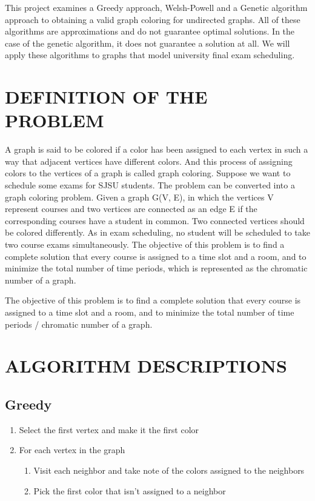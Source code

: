 \documentclass[12]{article}
\begin{document}
This project examines a Greedy approach, Welsh-Powell and a Genetic algorithm approach to obtaining a valid graph coloring for undirected graphs. All of these algorithms are approximations and do not guarantee optimal solutions. In the case of the genetic algorithm, it does not guarantee a solution at all. We will apply these algorithms to graphs that model university final exam scheduling.

\section{DEFINITION OF THE PROBLEM}
A graph is said to be colored if a color has been assigned to each vertex in such a way that adjacent vertices have different colors. And this process of assigning colors to the vertices of a graph is called graph coloring.
Suppose we want to schedule some exams for SJSU students. The problem can be converted into a graph coloring problem. Given a graph G(V, E), in which the vertices V represent courses and two vertices are connected as an edge E if the corresponding courses have a student in common. Two connected vertices should be colored differently. As in exam scheduling, no student will be scheduled to take two course exams simultaneously. The objective of this problem is to find a complete solution that every course is assigned to a time slot and a room, and to minimize the total number of time periods, which is represented as the chromatic number of a graph.

The objective of this problem is to find a complete solution that every course is assigned to a time slot and a room, and to minimize the total number of time periods / chromatic number of a graph.

\section{ALGORITHM DESCRIPTIONS}
\subsection*{Greedy}
\begin{enumerate}
	\item Select the first vertex and make it the first color
	\item For each vertex in the graph
	\begin{enumerate}
		\item Visit each neighbor and take note of the colors assigned to the neighbors
		\item Pick the first color that isn't assigned to a neighbor
	\end{enumerate}
\end{enumerate}
\end{document}
